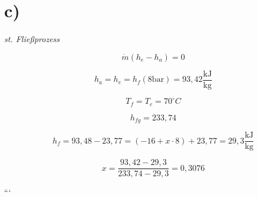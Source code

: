

\section*{c)}

\textit{st. Fließprozess}

\[
\dot{m} (h_e - h_a) = 0
\]

\[
h_a = h_e = h_f (8 \text{bar}) = 93,42 \frac{\text{kJ}}{\text{kg}}
\]

\[
T_f = T_e = 70^\circ C
\]

\[
h_{fg} = 233,74
\]

\[
h_f = 93,48 - 23,77 = (-16 + x \cdot 8) + 23,77 = 29,3 \frac{\text{kJ}}{\text{kg}}
\]

\[
x = \frac{93,42 - 29,3}{233,74 - 29,3} = 0,3076
\]

```